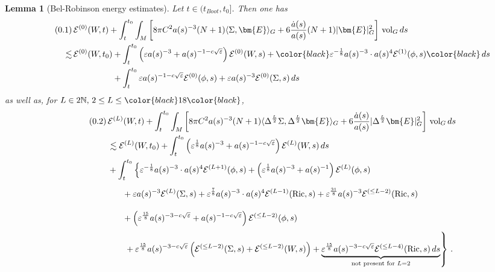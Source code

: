 \documentclass[11pt,leqno,textwidth=10cm]{amsart}
\numberwithin{equation}{section}
\theoremstyle{definition}
\theoremstyle{plain}
\newtheorem{lemma}[definition]{Lemma}
\newcommand{\1}{\mathbbm{1}}
\newcommand{\E}{\mathcal{E}}
\newcommand{\N}{\mathbb{N}}
\newcommand{\Ric}{\text{\normalfont{Ric}}}
\newcommand{\vol}[1]{{\text{\normalfont{vol}}}_{#1}}
\renewcommand{\epsilon}{\varepsilon}
\newcommand{\Lap}{\Delta}
\newcommand{\numberthis}{\addtocounter{equation}{1}\tag{\theequation}}
\renewcommand{\theequation}{\arabic{section}.\arabic{equation}}
\newcommand{\RE}{\bm{E}}
\newcommand{\change}[1]{\color{black}#1\color{black}}
\begin{document}
\begin{lemma}[\change{Bel-Robinson energy estimates}]\label{lem:en-est-BR} Let $t\in(t_{Boot},t_0]$. Then one has
\begin{align*}
\numberthis\label{eq:en-est-BR0}&\,\E^{(0)}(W,t)+\int_t^{t_0}\int_M\left[8\pi C^2a(s)^{-3}(N+1)\langle\Sigma,\RE\rangle_G+6\frac{\dot{a}(s)}{a(s)}(N+1)\lvert\RE\rvert_G^2\right]\,\vol{G}\,ds\\
\lesssim&\,\E^{(0)}(W,t_0)+\int_t^{t_0}\left({\epsilon}a(s)^{-3}+a(s)^{-1-c\sqrt{\epsilon}}\right)\E^{(0)}(W,s)+\change{\epsilon^{-\frac18}a(s)^{-3}\cdot a(s)^4\E^{(1)}(\phi,s)}\,ds\\
&\,\phantom{\E^{(0)}(W,t_0)}+\int_t^{t_0}\epsilon a(s)^{-1-c\sqrt{\epsilon}}\E^{(0)}(\phi,s)+\epsilon a(s)^{-3}\E^{(0)}(\Sigma,s)\,ds
\end{align*}
as well as, for $L\in 2\N,\,2\leq L\leq \change{18}$,
\change{\begin{align*}
\numberthis\label{eq:en-est-BR}&\,\E^{(L)}(W,t)+\int_t^{t_0}\int_M\left[8\pi C^2a(s)^{-3}(N+1)\langle\Lap^\frac{L}2\Sigma,\Lap^\frac{L}2\RE\rangle_G+6\frac{\dot{a}(s)}{a(s)}\lvert\Lap^\frac{L}2\RE\rvert_G^2\right]\,\vol{G}\,ds\\
&\,\lesssim\E^{(L)}(W,t_0)+\int_t^{t_0}\left(\epsilon^\frac18 a(s)^{-3}+a(s)^{-1-c\sqrt{\epsilon}}\right)\E^{(L)}(W,s)\,ds\\
&\,+\int_t^{t_0}\left\{\epsilon^{-\frac18}a(s)^{-3}\cdot a(s)^4\E^{(L+1)}(\phi,s)+\left(\epsilon^\frac18 a(s)^{-3}+a(s)^{-1}\right)\E^{(L)}(\phi,s)\right.\\
&\,\phantom{\int_t^{t_0}}+\epsilon a(s)^{-3}\E^{(L)}(\Sigma,s)+\epsilon^\frac{7}8a(s)^{-3}\cdot a(s)^4\E^{(L-1)}(\Ric,s)+\epsilon^\frac{31}8 a(s)^{-3}\E^{(\leq L-2)}(\Ric,s)\\
&\,\phantom{\int_t^{t_0}}+\left(\epsilon^\frac{15}8 a(s)^{-3-c\sqrt{\epsilon}}+a(s)^{-1-c\sqrt{\epsilon}}\right)\E^{(\leq L-2)}(\phi,s)\\
&\,\left.\phantom{\int_t^{t_0}}+\epsilon^\frac{15}8 a(s)^{-3-c\sqrt{\epsilon}}\left(\E^{(\leq L-2)}(\Sigma,s)+\E^{(\leq L-2)}(W,s)\right)+\underbrace{\epsilon^\frac{15}8 a(s)^{-3-c\sqrt{\epsilon}}\E^{(\leq L-4)}(\Ric,s)\,ds}_{\text{not present for }L=2}\right\}\,.
\end{align*}}
\end{lemma}
\end{document}
